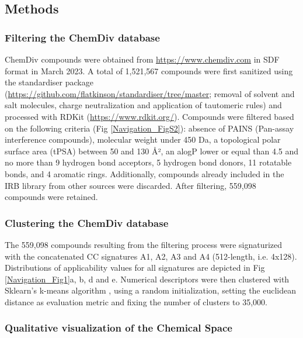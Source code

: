 \subsection{Methods}
\label{Navigation_Methods}



\subsubsection{Filtering the ChemDiv database}

ChemDiv compounds were obtained from \url{https://www.chemdiv.com} in SDF format in March 2023. A total of 1,521,567 compounds were first sanitized using the standardiser package (\url{https://github.com/flatkinson/standardiser/tree/master}; removal of solvent and salt molecules, charge neutralization and application of tautomeric rules) and processed with RDKit (\url{https://www.rdkit.org/}). Compounds were filtered based on the following criteria (Fig \ref{Navigation_FigS2}): absence of PAINS\cite{baell_chemistry_2014} (Pan-assay interference compounds), molecular weight under 450 Da, a topological polar surface area (tPSA) between 50 and 130 Å², an alogP lower or equal than 4.5 and no more than 9 hydrogen bond acceptors, 5 hydrogen bond donors, 11 rotatable bonds, and 4 aromatic rings. Additionally, compounds already included in the IRB library from other sources were discarded. After filtering, 559,098 compounds were retained.


\subsubsection{Clustering the ChemDiv database}

The 559,098 compounds resulting from the filtering process were signaturized with the concatenated CC signatures A1, A2, A3 and A4 (512-length, i.e. 4x128). Distributions of applicability values for all signatures are depicted in Fig \ref{Navigation_Fig1}a, b, d and e. Numerical descriptors were then clustered with Sklearn’s k-means algorithm \cite{pedregosa_scikit-learn_2011}, using a random initialization, setting the euclidean distance as evaluation metric and fixing the number of clusters to 35,000. 

\subsubsection{Qualitative visualization of the Chemical Space}

